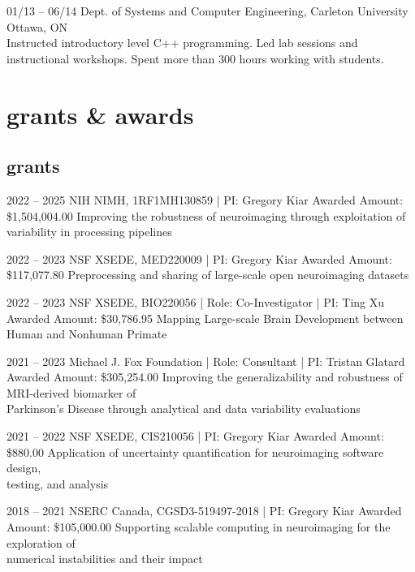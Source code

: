 \documentclass[]{friggeri-cv} %
\begin{document}
\begin{entrylist}
\entry
{01/13 -- 06/14}
{Dept. of Systems and Computer Engineering, Carleton University}
{Ottawa, ON}
{\\
Instructed introductory level C++ programming. Led lab sessions and instructional workshops. Spent more than 300 hours
working with students.}
\end{entrylist}


\section{grants \& awards}
\subsection{grants}
\begin{entrylist}
\entry
{2022 -- 2025}
{NIH NIMH, 1RF1MH130859 | PI: Gregory Kiar}
{Awarded Amount: \$1,504,004.00}
{Improving the robustness of neuroimaging through exploitation of variability in processing pipelines}

\entry
{2022 -- 2023}
{NSF XSEDE, MED220009 | PI: Gregory Kiar}
{Awarded Amount: \$117,077.80}
{Preprocessing and sharing of large-scale open neuroimaging datasets}

\entry
{2022 -- 2023}
{NSF XSEDE, BIO220056 | Role: Co-Investigator | PI: Ting Xu}
{Awarded Amount: \$30,786.95}
{Mapping Large-scale Brain Development between Human and Nonhuman Primate}

\entry
{2021 -- 2023}
{Michael J. Fox Foundation | Role: Consultant | PI: Tristan Glatard}
{Awarded Amount: \$305,254.00}
{Improving the generalizability and robustness of MRI-derived biomarker of \\ Parkinson's Disease through analytical and data variability evaluations}

\entry
{2021 -- 2022}
{NSF XSEDE, CIS210056 | PI: Gregory Kiar}
{Awarded Amount: \$880.00}
{Application of uncertainty quantification for neuroimaging software design,\\ testing, and analysis}

\entry
{2018 -- 2021}
{NSERC Canada, CGSD3-519497-2018 | PI: Gregory Kiar}
{Awarded Amount: \$105,000.00}
{Supporting scalable computing in neuroimaging for the exploration of \\numerical instabilities and their impact}
\end{entrylist}
\end{document}
